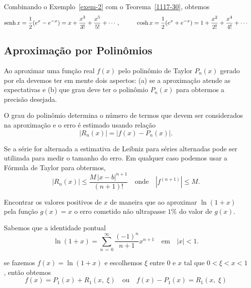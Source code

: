 \begin{exer} Combinando o Exemplo~\ref{exem-2} com o Teorema~\ref{1117-30}, obtemos
\begin{align*}
\operatorname{senh} x = \dfrac{1}{2}(e^x - e^{-x}) = x +\dfrac{x^3}{3!} +\dfrac{x^5}{5!}+\cdots,\quad &&
\quad \cosh x = \dfrac{1}{2}(e^x + e^{-x})=1+\dfrac{x^2}{2!}+\dfrac{x^4}{4!}+\cdots
\end{align*}
\end{exer}

\subsection{Aproximação por Polinômios}
Ao aproximar uma função real \(f(x)\) pelo polinômio de Taylor \(P_{n}(x)\) gerado por ela devemos ter 
em mente dois aspectos: (a) se a aproximação atende as expectativas e (b) que grau deve ter o polinômio 
\(P_{n}(x)\) para obtermos a precisão desejada. 

O grau do polinômio determina o número de termos que devem ser considerados na aproximação e o erro 
é estimado usando relação
\begin{equation*}
\left|R_{n}(x)\right| =\left|f(x)-P_{n}(x)\right|.
\end{equation*}

Se a série for alternada a estimativa de Leibniz para séries alternadas pode ser utilizada para medir o
tamanho do erro. Em qualquer caso podemos usar a Fórmula de Taylor para obtermos,
\begin{equation*}
\left|R_{n}(x)\right| \leq \dfrac{M\,|x-b|^{n+1}}{(n+1)!} \quad\text{onde}\quad |f^{(n+1)}| \leq M.
\end{equation*}

\begin{exer}
Encontrar os valores positivos de \(x\)  de maneira que ao aproximar \(\ln(1+x)\) pela função \(g(x)=x\)
o erro cometido não ultrapasse \(1\%\) do valor de \(g(x)\).
\end{exer}

\solo
Sabemos que a identidade pontual 
\begin{equation*}
\ln(1+x)=\sum_{n\, =\, 0}^{\infty}\dfrac{(-1)^{n}}{n+1}x^{n+1} \quad  \text{em}\quad |x| <1.
\end{equation*}

se fazemos \(f(x)=\ln(1+x)\) e escolhemos \(\xi\) entre \(0\) e \(x\) tal que \(0 <\xi < x <1\), então 
obtemos 
\begin{equation*}
  f(x)=P_{1}(x)+R_{1}(x,\; \xi) \quad \text{ou}\quad f(x)-P_{1}(x)=R_{1}(x,\; \xi)
\end{equation*}

